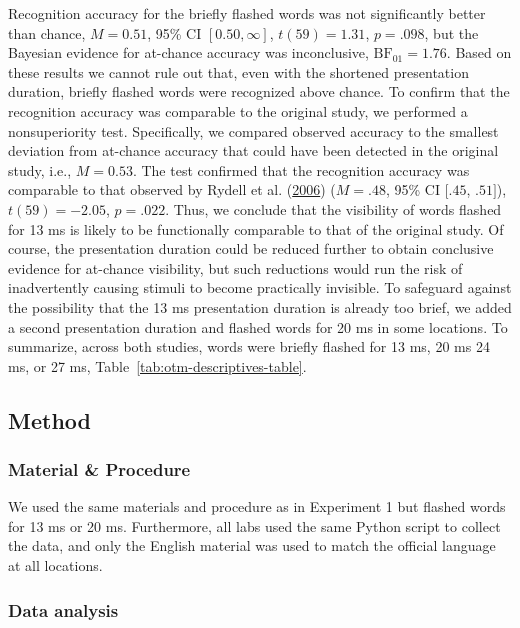 \documentclass[
  man,floatsintext]{apa6}
\begin{document}
Recognition accuracy for the briefly flashed words was not significantly better than chance, \(M = 0.51\), 95\% CI \([0.50, \infty]\), \(t(59) = 1.31\), \(p = .098\), but the Bayesian evidence for at-chance accuracy was inconclusive, \(\mathrm{BF}_{\textrm{01}} = 1.76\).
Based on these results we cannot rule out that, even with the shortened presentation duration, briefly flashed words were recognized above chance.
To confirm that the recognition accuracy was comparable to the original study, we performed a nonsuperiority test.
Specifically, we compared observed accuracy to the smallest deviation from at-chance accuracy that could have been detected in the original study, i.e., \(M = 0.53\).
The test confirmed that the recognition accuracy was comparable to that observed by Rydell et al. (\protect\hyperlink{ref-rydell_two_2006}{2006}) (\(M = .48\), 95\% CI \([.45\), \(.51]\)), \(t(59) = -2.05\), \(p = .022\).
Thus, we conclude that the visibility of words flashed for 13 ms is likely to be functionally comparable to that of the original study.
Of course, the presentation duration could be reduced further to obtain conclusive evidence for at-chance visibility, but such reductions would run the risk of inadvertently causing stimuli to become practically invisible.
To safeguard against the possibility that the 13 ms presentation duration is already too brief, we added a second presentation duration and flashed words for 20 ms in some locations.
To summarize, across both studies, words were briefly flashed for 13 ms, 20 ms 24 ms, or 27 ms, Table~\ref{tab:otm-descriptives-table}.

\hypertarget{method}{%
\subsection{Method}\label{method}}

\hypertarget{material-procedure-1}{%
\subsubsection{Material \& Procedure}\label{material-procedure-1}}

We used the same materials and procedure as in Experiment 1 but flashed words for 13 ms or 20 ms.
Furthermore, all labs used the same Python script to collect the data, and only the English material was used to match the official language at all locations.

\hypertarget{data-analysis}{%
\subsubsection{Data analysis}\label{data-analysis}}
\end{document}
